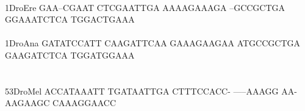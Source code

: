 \documentclass[11pt,twoside,reqno,a4paper]{article}
\begin{document}
{\hspace*{4\charwidth}\hspace*{7\charwidth}\hspace*{1\charwidth}\hspace*{1\charwidth}\hspace*{1\charwidth}\hspace*{1\charwidth}\hspace*{1\charwidth}\hspace*{1\charwidth}\\
1\hspace*{3\charwidth}DroEre	GAA--CGAAT	CTCGAATTGA	AAAAGAAAGA	--GCCGCTGA	GGAAATCTCA	TGGACTGAAA	\\
\hspace*{4\charwidth}\hspace*{7\charwidth}\hspace*{1\charwidth}\hspace*{1\charwidth}\hspace*{1\charwidth}\hspace*{1\charwidth}\hspace*{1\charwidth}\hspace*{1\charwidth}\\
1\hspace*{3\charwidth}DroAna	GATATCCATT	CAAGATTCAA	GAAAGAAGAA	ATGCCGCTGA	GAAGATCTCA	TGGATGGAAA	\\
\hspace*{4\charwidth}\hspace*{7\charwidth}\hspace*{1\charwidth}\hspace*{1\charwidth}\hspace*{1\charwidth}\hspace*{1\charwidth}\hspace*{1\charwidth}\hspace*{1\charwidth}\\
\\
53\hspace*{2\charwidth}DroMel	ACCATAAATT	TGATAATTGA	CTTTCCACC-	-----AAAGG	AA-AAGAAGC	CAAAGGAACC	\\
\hspace*{4\charwidth}\hspace*{7\charwidth}\hspace*{1\charwidth}\hspace*{1\charwidth}\hspace*{1\charwidth}\hspace*{1\charwidth}\hspace*{1\charwidth}\hspace*{1\charwidth}\\
}
\end{document}
